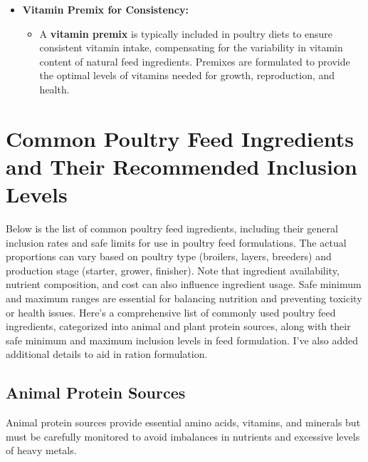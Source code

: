 \documentclass[a4paper,12pt]{article}
\begin{document}
\begin{itemize}
	\item \textbf{Vitamin Premix for Consistency:}
	\begin{itemize}
		\item A \textbf{vitamin premix} is typically included in poultry diets to ensure consistent vitamin intake, compensating for the variability in vitamin content of natural feed
ingredients. Premixes are formulated to provide the optimal levels of vitamins
needed for growth, reproduction, and health.
	\end{itemize}
\end{itemize}

\newpage

\section{Common Poultry Feed Ingredients and Their Recommended Inclusion Levels}
Below is the list of common poultry feed ingredients, including their general inclusion rates and
safe limits for use in poultry feed formulations. The actual proportions can vary based on poultry
type (broilers, layers, breeders) and production stage (starter, grower, finisher). Note that
ingredient availability, nutrient composition, and cost can also influence ingredient usage. Safe
minimum and maximum ranges are essential for balancing nutrition and preventing toxicity or
health issues. Here's a comprehensive list of commonly used poultry feed ingredients, categorized into animal and plant protein sources, along with their safe minimum and maximum inclusion levels in feed formulation. I've also added additional details to aid in ration formulation.

\subsection{Animal Protein Sources}
Animal protein sources provide essential amino acids, vitamins, and minerals but must be
carefully monitored to avoid imbalances in nutrients and excessive levels of heavy metals.
\end{document}
